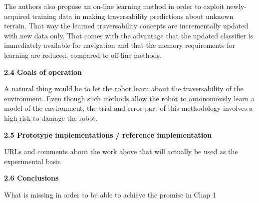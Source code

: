 \documentclass[12pt,a4paper]{article}
\begin{document}
	The authors also propose an on-line learning method in order to exploit 
	newly-acquired training data in making traversability predictions about 
	unknown terrain. That way the learned traversability concepts are 
	incrementally updated with new data only. That comes with the advantage that the 
	updated classifier is immediately available for navigation and that the 
	memory requirements for learning are reduced, compared to off-line methods.
	\newline\newline
	
	\large\textbf{2.4 Goals of operation}
	\normalsize\newline
	
	A natural thing would be to let the robot learn about the 
	traversability of the environment. Even though such methods allow the robot to 
	autonomously learn a model of the environment, the trial and error part of this 
	methodology involves a high risk to damage the robot.
	\newline\newline
	
	\large\textbf{2.5 Prototype implementations / reference implementation}
	\normalsize\newline
	
	URLs and comments about the work above that will actually be used as 
	the experimental basis
	\newline\newline
	
	\large\textbf{2.6 Conclusions}
	\normalsize\newline
	
	What is missing in order to be able to achieve the promise in Chap 1
	
\end{document}
